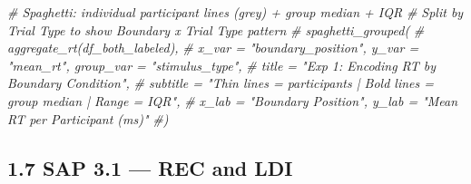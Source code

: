 \documentclass[
]{article}
\newenvironment{Shaded}{\begin{snugshade}}{\end{snugshade}}
\newcommand{\CommentTok}[1]{\textcolor[rgb]{0.56,0.35,0.01}{\textit{#1}}}
\begin{document}
\begin{Shaded}
\begin{Highlighting}[]
\CommentTok{\# Spaghetti: individual participant lines (grey) + group median + IQR}
\CommentTok{\# Split by Trial Type to show Boundary x Trial Type pattern}
\CommentTok{\# spaghetti\_grouped(}
\CommentTok{\#  aggregate\_rt(df\_both\_labeled),}
\CommentTok{\#  x\_var = "boundary\_position", y\_var = "mean\_rt", group\_var = "stimulus\_type",}
\CommentTok{\#  title    = "Exp 1: Encoding RT by Boundary Condition",}
\CommentTok{\#  subtitle = "Thin lines = participants | Bold lines = group median | Range = IQR",}
\CommentTok{\#  x\_lab = "Boundary Position", y\_lab = "Mean RT per Participant (ms)"}
\CommentTok{\#)}
\end{Highlighting}
\end{Shaded}

\subsection{1.7 SAP 3.1 --- REC and LDI}\label{sap-3.1-rec-and-ldi}
\end{document}
